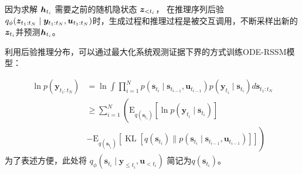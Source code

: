 因为求解 $\boldsymbol{h}_{t_i}$ 需要之前的随机隐状态 $\boldsymbol z_{<t_i}$， 在推理序列后验$q_{\phi}(\boldsymbol z_{t_1:t_N}\mid\boldsymbol y_{t_1:t_N},\boldsymbol u_{t_1:t_N})$时，生成过程和推理过程是被交互调用，不断采样出新的$\boldsymbol{z}_{t_i}$并预测$\boldsymbol{h}_{t_i}$。


利用后验推理分布，可以通过最大化系统观测证据下界的方式训练ODE-RSSM模型：

\begin{equation}
\begin{aligned} 
\ln p\left(\boldsymbol{y}_{t_{1}: t_{N}}\right)&=\ln \int \prod_{i=1}^{N} p\left(\boldsymbol{s}_{t_{i}} \mid \boldsymbol{s}_{t_{i-1}},\boldsymbol{u}_{t_{i-1}} \right) p\left(\boldsymbol{y}_{t_{i}} \mid \boldsymbol{s}_{t_{i}}\right) d \boldsymbol{s}_{t_{1}: t_{N}} \\ 
 &\geq\sum_{i=1}^{N}\left(\mathrm{E}_{q(\boldsymbol{s}_{t_{i}})}\left[\ln p\left(\boldsymbol{y}_{t_{i}} \mid \boldsymbol{s}_{t_{i}}\right)\right]\right.\\
&-\left.\mathrm{E}_{q(\boldsymbol{s}_{t_{i}})}\left[\operatorname{KL}\left[q(\boldsymbol{s}_{t_{i}}) \| p\left(\boldsymbol{s}_{t_{i}} \mid \boldsymbol{s}_{t_{i-1}},\boldsymbol{u}_{t_{i-1}}\right)\right]\right]\right)
\end{aligned}
\label{equ:loss_single}
\end{equation}
为了表述方便，此处将 $q_\phi\left(\boldsymbol{s}_{t_{i}} \mid \boldsymbol{y}_{\leq t_i},\boldsymbol{u}_{<t_{i}} \right)$ 简记为$q(\boldsymbol{s}_{t_{i}})$。

